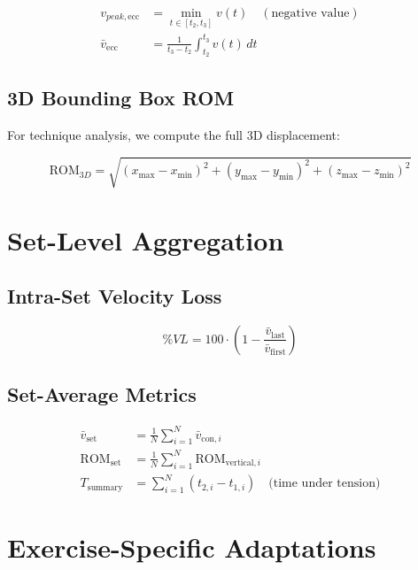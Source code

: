 \begin{align}
    v_{peak,\text{ecc}} &= \min_{t \in [t_2, t_3]} v(t) \quad (\text{negative value}) \\
    \bar{v}_{\text{ecc}} &= \frac{1}{t_3 - t_2} \int_{t_2}^{t_3} v(t) \, dt
\end{align}

\subsection{3D Bounding Box ROM}

For technique analysis, we compute the full 3D displacement:

\begin{equation}
    \text{ROM}_{3D} = \sqrt{(x_{\max} - x_{\min})^2 + (y_{\max} - y_{\min})^2 + (z_{\max} - z_{\min})^2}
\end{equation}

\section{Set-Level Aggregation}

\subsection{Intra-Set Velocity Loss}

\begin{equation}
    \%VL = 100 \cdot \left(1 - \frac{\bar{v}_{\text{last}}}{\bar{v}_{\text{first}}}\right)
\end{equation}

\subsection{Set-Average Metrics}

\begin{align}
    \bar{v}_{\text{set}} &= \frac{1}{N} \sum_{i=1}^{N} \bar{v}_{\text{con}, i} \\
    \text{ROM}_{\text{set}} &= \frac{1}{N} \sum_{i=1}^{N} \text{ROM}_{\text{vertical}, i} \\
    T_{\text{summary}} &= \sum_{i=1}^{N} (t_{2,i} - t_{1,i}) \quad \text{(time under tension)}
\end{align}

\section{Exercise-Specific Adaptations}

